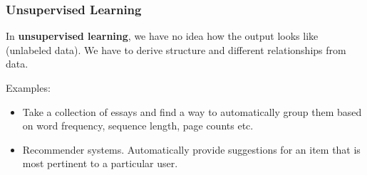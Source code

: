 \documentclass{beamer}
\begin{document}
	\begin{frame}
		\frametitle{Unsupervised Learning}
		In \textbf{unsupervised learning}, we have no idea how the output looks like (unlabeled data). We have to derive structure and different relationships from data.
		
		Examples:
		\begin{itemize}
			\item Take a collection of essays and find a way to automatically group them based on word frequency, sequence length, page counts etc.
			\item Recommender systems. Automatically provide suggestions for an item
			that is most pertinent to a particular user.
		\end{itemize} 
		
	\end{frame}
	
\end{document}
